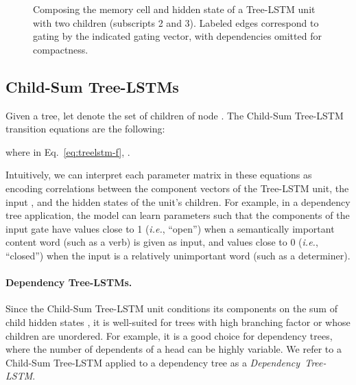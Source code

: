 \documentclass[11pt]{article}
\begin{document}
\begin{figure}[t]
\begin{center}
\end{center}
\caption{Composing the memory cell  and hidden state  of a Tree-LSTM unit with two children (subscripts 2 and 3). Labeled edges correspond to gating by the indicated gating vector, with dependencies omitted for compactness.}
\end{figure}

\subsection{Child-Sum Tree-LSTMs}
\label{sec:child-sum-treelstms}

Given a tree, let  denote the set of children of node . The Child-Sum Tree-LSTM transition equations are the following:

where in Eq.~\ref{eq:treelstm-f}, .

Intuitively, we can interpret each parameter matrix in these equations as encoding correlations between the component vectors of the Tree-LSTM unit, the input , and the hidden states  of the unit's children. For example, in a dependency tree application, the model can learn parameters  such that the components of the input gate  have values close to 1 (\emph{i.e.}, ``open'') when a semantically important content word (such as a verb) is given as input, and values close to 0 (\emph{i.e.}, ``closed'') when the input is a relatively unimportant word (such as a determiner).

\paragraph{Dependency Tree-LSTMs.} Since the Child-Sum Tree-LSTM unit conditions its components on the sum of child hidden states , it is well-suited for trees with high branching factor or whose children are unordered. For example, it is a good choice for dependency trees, where the number of dependents of a head can be highly variable. We refer to a Child-Sum Tree-LSTM applied to a dependency tree as a \mbox{\emph{Dependency Tree-LSTM}}.
\end{document}
